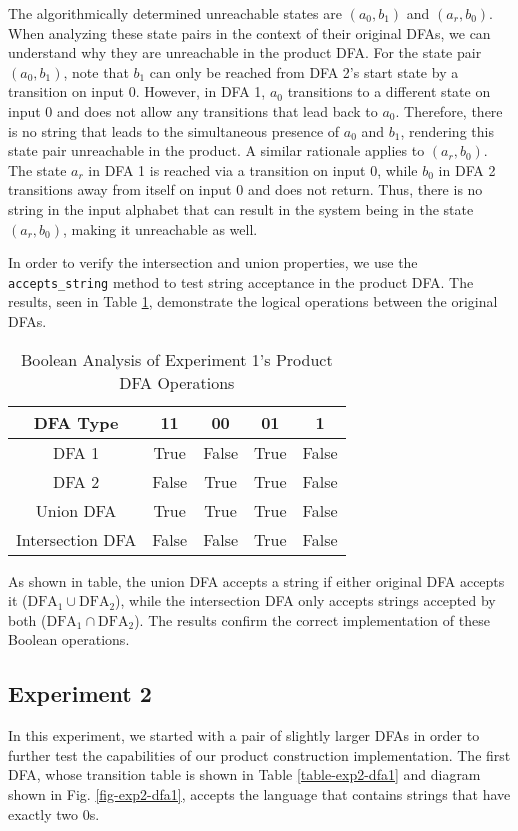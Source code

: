 \documentclass[conference]{IEEEtran}
\begin{document}
The algorithmically determined unreachable states are \( (a_0, b_1) \) and \( (a_r, b_0) \). When analyzing these state pairs in the context of their original DFAs, we can understand why they are unreachable in the product DFA. For the state pair \( (a_0, b_1) \), note that \( b_1 \) can only be reached from DFA 2's start state by a transition on input 0. However, in DFA 1, \( a_0 \) transitions to a different state on input 0 and does not allow any transitions that lead back to \( a_0 \). Therefore, there is no string that leads to the simultaneous presence of \( a_0 \) and \( b_1 \), rendering this state pair unreachable in the product. A similar rationale applies to \( (a_r, b_0) \). The state \( a_r \) in DFA 1 is reached via a transition on input 0, while \( b_0 \) in DFA 2 transitions away from itself on input 0 and does not return. Thus, there is no string in the input alphabet that can result in the system being in the state \( (a_r, b_0) \), making it unreachable as well.

In order to verify the intersection and union properties, we use the \texttt{accepts\_string} method to test string acceptance in the product DFA. The results, seen in Table \ref{table-exp1-dfabool}, demonstrate the logical operations between the original DFAs.

\begin{table}[h!]
\centering
\caption{Boolean Analysis of Experiment 1's Product DFA Operations}
\label{table-exp1-dfabool}
\begin{tabular}{|c|c|c|c|c|}
\hline
\textbf{DFA Type} & \textbf{11} & \textbf{00} & \textbf{01} & \textbf{1} \\ \hline
DFA 1 & True & False & True & False \\ \hline
DFA 2 & False & True & True & False \\ \hline
Union DFA & True & True & True & False \\ \hline
Intersection DFA & False & False & True & False \\ \hline
\end{tabular}
\end{table} 

As shown in table, the union DFA accepts a string if either original DFA accepts it ($\text{DFA}_1 \cup \text{DFA}_2$), while the intersection DFA only accepts strings accepted by both ($\text{DFA}_1 \cap \text{DFA}_2$). The results confirm the correct implementation of these Boolean operations.

\subsection{Experiment 2}
In this experiment, we started with a pair of slightly larger DFAs in order to further test the capabilities of our product construction implementation. The first DFA, whose transition table is shown in Table \ref{table-exp2-dfa1} and diagram shown in Fig. \ref{fig-exp2-dfa1}, accepts the language that contains strings that have exactly two 0s.
\end{document}

